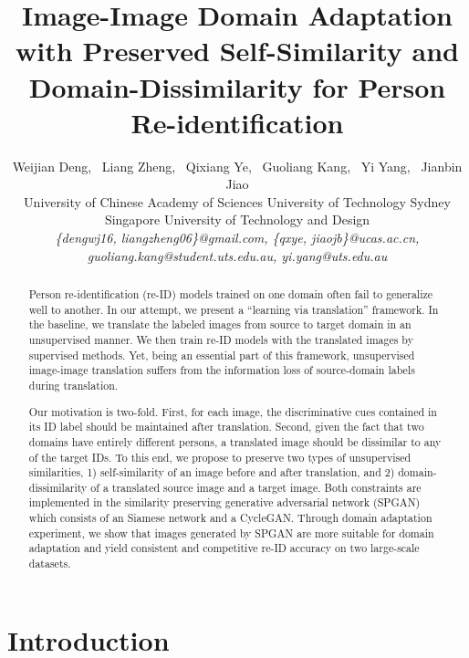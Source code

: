 \documentclass[10pt,twocolumn,letterpaper]{article}
\begin{document}
\title{Image-Image Domain Adaptation with Preserved Self-Similarity and Domain-Dissimilarity for Person Re-identification}


\author{Weijian Deng, \ Liang Zheng,  \ Qixiang Ye, \ Guoliang Kang, \ Yi Yang, \ Jianbin Jiao\\
University of Chinese Academy of Sciences \quad University of Technology Sydney\\ \quad Singapore University of Technology and Design\\
\textsl{{\small \{dengwj16, liangzheng06\}@gmail.com, \{qxye, jiaojb\}@ucas.ac.cn, guoliang.kang@student.uts.edu.au,  yi.yang@uts.edu.au}}\\
 }

\maketitle
\thispagestyle{empty}

\begin{abstract}\label{abstract}
Person re-identification (re-ID) models trained on one domain often fail to generalize well to another. In our attempt, we present a ``learning via translation'' framework. In the baseline, we translate the labeled images from source to target domain in an unsupervised manner. We then train re-ID models with the translated images by supervised methods. Yet, being an essential part of this framework, unsupervised image-image translation suffers from the information loss of source-domain labels during translation.

Our motivation is two-fold. First, for each image, the discriminative cues contained in its ID label should be maintained after translation. Second, given the fact that two domains have entirely different persons, a translated image should be dissimilar to any of the target IDs. To this end, we propose to preserve two types of unsupervised similarities, 1) self-similarity of an image before and after translation, and 2) domain-dissimilarity of a translated source image and a target image. Both constraints are implemented in the similarity preserving generative adversarial network (SPGAN) which consists of an Siamese network and a CycleGAN. Through domain adaptation experiment, we show that images generated by SPGAN are more suitable for domain adaptation and yield consistent and competitive re-ID accuracy on two large-scale datasets.
\end{abstract}


\section{Introduction}\label{Introduction}
\end{document}

